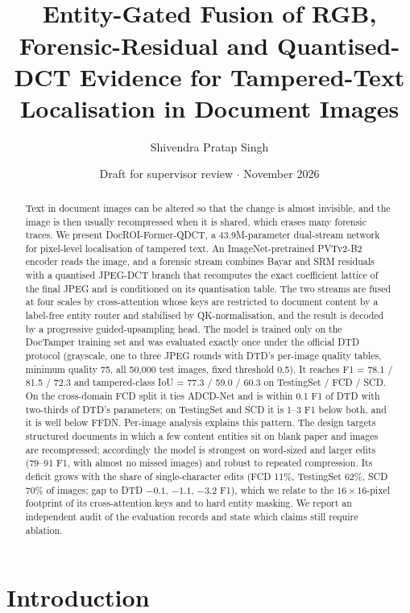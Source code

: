 \documentclass[11pt,a4paper]{article}
\title{{\LARGE\textbf{\ours}}\\[8pt]
{\Large\textbf{Entity-Gated Fusion of RGB, Forensic-Residual and Quantised-DCT Evidence
for Tampered-Text Localisation in Document Images}}}
\author{Shivendra Pratap Singh}
\date{Draft for supervisor review \quad$\cdot$\quad 26 November 2026}
\newcommand{\ours}{DocROI-Former-QDCT}
\begin{document}
\maketitle

\begin{abstract}
\noindent
Text in document images can be altered so that the change is almost invisible, and the image
is then usually recompressed when it is shared, which erases many forensic traces. We present
\ours, a 43.9M-parameter dual-stream network for pixel-level localisation of tampered text.
An ImageNet-pretrained PVTv2-B2 encoder reads the image, and a forensic stream combines
Bayar and SRM residuals with a quantised JPEG-DCT branch that recomputes the exact coefficient
lattice of the final JPEG and is conditioned on its quantisation table. The two streams are
fused at four scales by cross-attention whose keys are restricted to document content by a
label-free entity router and stabilised by QK-normalisation, and the result is decoded by a
progressive guided-upsampling head. The model is trained only on the DocTamper training set
and was evaluated exactly once under the official DTD protocol (grayscale, one to three JPEG
rounds with DTD's per-image quality tables, minimum quality 75, all 50{,}000 test images,
fixed threshold 0.5). It reaches F1 = 78.1 / 81.5 / 72.3 and tampered-class IoU = 77.3 /
59.0 / 60.3 on TestingSet / FCD / SCD. On the cross-domain FCD split it ties ADCD-Net and is
within 0.1 F1 of DTD with two-thirds of DTD's parameters; on TestingSet and SCD it is 1--3 F1
below both, and it is well below FFDN. Per-image analysis explains this pattern. The design
targets structured documents in which a few content entities sit on blank paper and images are
recompressed; accordingly the model is strongest on word-sized and larger edits (79--91 F1, with
almost no missed images) and robust to repeated compression. Its deficit grows with the share of
single-character edits (FCD 11\%, TestingSet 62\%, SCD 70\% of images; gap to DTD $-0.1$, $-1.1$,
$-3.2$ F1), which we relate to the $16\times16$-pixel footprint of its cross-attention keys and to
hard entity masking. We report an independent audit of the evaluation records and state which
claims still require ablation.
\end{abstract}

\section{Introduction}\label{sec:intro}
\end{document}
